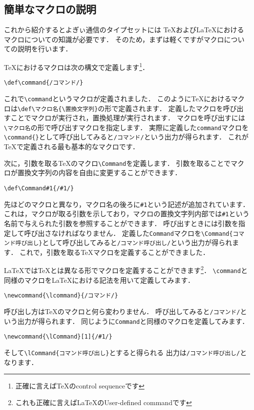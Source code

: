\subsection{簡単なマクロの説明}
\newcommand{\lcommand}{/コマンド/}
\newcommand{\lCommand}[1]{/#1/}
{
\def\command{/コマンド/}
\def\Command#1{/#1/}

これから紹介するとよぎぃ通信のタイプセットには
{\TeX}および{\LaTeX}におけるマクロについての知識が必要です．
そのため，まずは軽くですがマクロについての説明を行います．

{\TeX}におけるマクロは次の構文で定義します\footnote{正確に言えば{\TeX}のcontrol sequenceです}．
\begin{verbatim}
\def\command{/コマンド/}
\end{verbatim}

これで\verb|\command|というマクロが定義されました．
このように{\TeX}におけるマクロは\verb|\def\マクロ名{\置換文字列}|の形で定義されます．
定義したマクロを呼び出すことでマクロが実行され，置換処理が実行されます．
マクロを呼び出すには\verb|\マクロ名|の形で呼び出すマクロを指定します．
実際に定義した\verb|command|マクロを\verb|\command{}|として呼び出してみると\texttt{\command{}}という出力が得られます．
これが{\TeX}で定義される最も基本的なマクロです．

次に，引数を取る{\TeX}のマクロ\verb|\Command|を定義します．
引数を取ることでマクロが置換文字列の内容を自由に変更することができます．
\begin{verbatim}
\def\Command#1{/#1/}
\end{verbatim}
先ほどのマクロと異なり，マクロ名の後ろに\verb|#1|という記述が追加されています．
これは，マクロが取る引数を示しており，マクロの置換文字列内部では\verb|#1|という名前で与えられた引数を参照することができます．
呼び出すときには引数を指定して呼び出さなければなりません．
定義した\texttt{Command}マクロを\verb|\Command{コマンド呼び出し}|として呼び出してみると\texttt{\Command{コマンド呼び出し}}という出力が得られます．
これで，引数を取る{\TeX}マクロを定義することができました．

{\LaTeX}では{\TeX}とは異なる形でマクロを定義することができます\footnote{これも正確に言えば{\LaTeX}のUser-defined commandです}．
\verb|\command|と同様のマクロを{\LaTeX}における記法を用いて定義してみます．
\begin{verbatim}
\newcommand{\lcommand}{/コマンド/}
\end{verbatim}
}
呼び出し方は{\TeX}のマクロと何ら変わりません．
呼び出してみると\texttt{\lcommand{}}という出力が得られます．
同じように\verb|Command|と同様のマクロを定義してみます．
\begin{verbatim}
\newcommand{\lCommand}[1]{/#1/}
\end{verbatim}
そして\verb|\lCommand{コマンド呼び出し}|とすると得られる
出力は\texttt{\lCommand{コマンド呼び出し}}となります．

